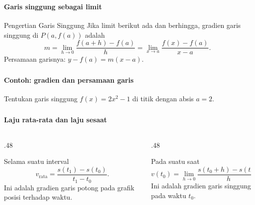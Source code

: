 \documentclass{../../kalkulus-ppt}
\begin{document}
\begin{frame}
\frametitle{\insertsection}
\framesubtitle{Garis singgung sebagai limit}

\begin{block}{Pengertian Garis Singgung}
Jika limit berikut ada dan berhingga, gradien garis singgung di $P(a,f(a))$ adalah
\[m=\lim_{h\to0}\frac{f(a+h)-f(a)}h
=\lim_{x\to a}\frac{f(x)-f(a)}{x-a}.\]
Persamaan garisnya: $y-f(a)=m(x-a)$.
\end{block}
\end{frame}


\begin{frame}
\frametitle{\insertsection}
\framesubtitle{Contoh: gradien dan persamaan garis}

\begin{contoh}
Tentukan garis singgung $f(x)=2x^2-1$ di titik dengan absis $a=2$.
\end{contoh}
\end{frame}


\begin{frame}
\frametitle{\insertsection}
\framesubtitle{Laju rata-rata dan laju sesaat}

\begin{columns}[t]
\begin{column}{.48\textwidth}
\begin{block}{Selama suatu interval}
\[v_{\mathrm{rata}}=\frac{s(t_1)-s(t_0)}{t_1-t_0}.\]
Ini adalah gradien garis potong pada grafik posisi terhadap waktu.
\end{block}
\end{column}
\begin{column}{.48\textwidth}
\begin{block}{Pada suatu saat}
\[v(t_0)=\lim_{h\to0}\frac{s(t_0+h)-s(t_0)}h.\]
Ini adalah gradien garis singgung pada waktu $t_0$.
\end{block}
\end{column}
\end{columns}
\end{frame}
\end{document}
